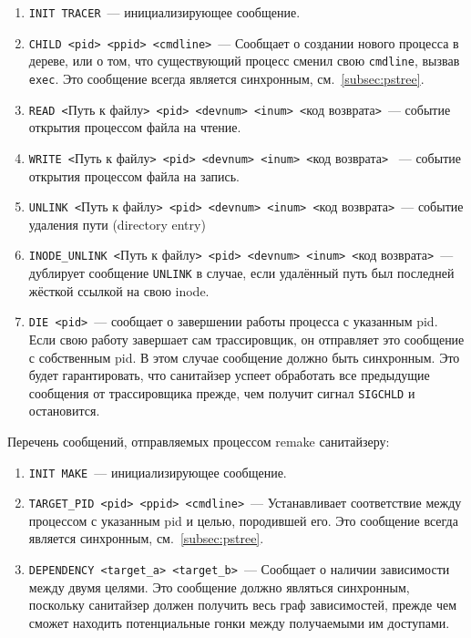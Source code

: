 \begin{enumerate}
    \item \texttt{INIT TRACER}~--- инициализирующее сообщение.
    \item \texttt{CHILD <pid> <ppid> <cmdline>}~--- Сообщает о создании нового процесса в дереве, или о том, что существующий процесс сменил свою \texttt{cmdline}, вызвав \texttt{exec}. Это сообщение всегда является синхронным, см.~\ref{subsec:pstree}.
    \item \texttt{READ <}Путь к файлу\texttt{> <pid> <devnum> <inum> <}код возврата\texttt{>}~--- событие открытия процессом файла на чтение.
    \item \texttt{WRITE <}Путь к файлу\texttt{> <pid> <devnum> <inum> <}код возврата\texttt{>}
    ~--- событие открытия процессом файла на запись.
    \item \texttt{UNLINK <}Путь к файлу\texttt{> <pid> <devnum> <inum> <}код возврата\texttt{>}~--- событие удаления пути (directory entry)
    \item \texttt{INODE\_UNLINK <}Путь к файлу\texttt{> <pid> <devnum> <inum> <}код возврата\texttt{>}~--- дублирует сообщение \texttt{UNLINK} в случае, если удалённый путь был последней жёсткой ссылкой на свою inode.
    \item \texttt{DIE <pid>}~--- сообщает о завершении работы процесса с указанным pid. Если свою работу завершает сам трассировщик, он отправляет это сообщение с собственным pid. В этом случае сообщение должно быть синхронным. Это будет гарантировать, что санитайзер успеет обработать все предыдущие сообщения от трассировщика прежде, чем получит сигнал \texttt{SIGCHLD} и остановится.
\end{enumerate}

Перечень сообщений, отправляемых процессом remake санитайзеру:

\begin{enumerate}
    \item \texttt{INIT MAKE}~--- инициализирующее сообщение.
    \item \texttt{TARGET\_PID <pid> <ppid> <cmdline>}~--- Устанавливает соответствие между процессом с указанным pid и целью, породившей его. Это сообщение всегда является синхронным, см.~\ref{subsec:pstree}.
    \item \texttt{DEPENDENCY <target\_a> <target\_b>}~--- Сообщает о наличии зависимости между двумя целями. Это сообщение должно являться синхронным, поскольку санитайзер должен получить весь граф зависимостей, прежде чем сможет находить потенциальные гонки между получаемыми им доступами.
\end{enumerate}

